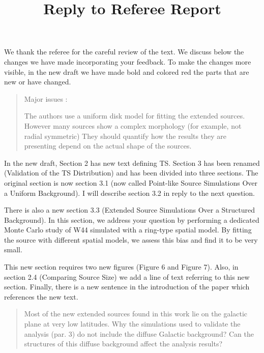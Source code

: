 \documentclass{article}
\title{Reply to Referee Report}
\newenvironment{referee}
{\begin{quote}\color{red}}
  {\end{quote}}
\newenvironment{reply}
  {}
  {}
\begin{document}
\maketitle

\begin{reply}
  We thank the referee for the careful review of the text. We discuss below the
changes we have made incorporating your feedback. To make the changes more visible,
in the new draft we have made bold and colored red the parts that are new or have changed.
\end{reply}

\begin{referee}
Major issues :

The authors use a uniform disk model for fitting the extended sources.
However many sources show a complex morphology (for example, not radial symmetric)
They should quantify how the results they are presenting depend on the actual shape of the sources.
\end{referee}


\begin{reply}
In the new draft, Section 2 has new text defining TS.
Section 3 has been renamed (Validation of the TS Distribution) and has been
divided into three sections. The original section is now section 3.1
(now called Point-like Source Simulations Over a Uniform Background).
I will describe section 3.2 in reply to the next question.

There is also a new section 3.3 (Extended Source Simulations Over a Structured Background). 
In this section, we address your question by performing
a dedicated Monte Carlo study of W44 simulated with a ring-type spatial
model. By fitting the source with different spatial models, we assess
this bias and find it to be very small.

This new section requires two new figures (Figure 6 and Figure 7). Also,
in section 2.4 (Comparing Source Size) we add a line of text referring
to this new section. Finally, there is a new sentence in the introduction
of the paper which references the new text.
\end{reply}


\begin{referee}
Most of the new extended sources found in this work lie on the galactic
plane at very low latitudes. Why the simulations used to validate the
analysis (par. 3) do not include the diffuse Galactic background? Can
the structures of this diffuse background affect the analysis results?
\end{referee}
\end{document}
